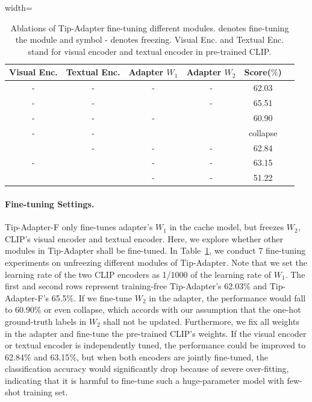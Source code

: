 \documentclass[10pt,twocolumn,letterpaper]{article}
\begin{document}
\begin{table}[t!]
\centering
\vspace*{13pt}
\begin{adjustbox}{width=\linewidth}
	\begin{tabular}{cccccc}
	\toprule
		 Visual Enc. & Textual Enc. 
		 & Adapter $W_1$ & Adapter $W_2$ & Score($\%$)\\ \midrule
		- &- &- &- &62.03\\
		- &- &\Checkmark &- &65.51\\
		- & - & - & \Checkmark &60.90\\
		- & - & \Checkmark & \Checkmark &collapse\\
		\Checkmark & - & - & - &62.84\\
		- & \Checkmark & - & - & 63.15\\
	    \Checkmark & \Checkmark & - & - & 51.22\\
	\bottomrule
	\end{tabular}
\end{adjustbox}
\caption{Ablations of Tip-Adapter fine-tuning different modules. \Checkmark denotes fine-tuning the module and symbol - denotes freezing. Visual Enc. and Textual Enc. stand for visual encoder and textual encoder in pre-trained CLIP.}
\vspace*{-12pt}
\label{fine-tune}
\end{table}


\paragraph{Fine-tuning Settings.}
Tip-Adapter-F only fine-tunes adapter's $W_1$ in the cache model, but freezes $W_2$, CLIP's visual encoder and textual encoder. Here, we explore whether other modules in Tip-Adapter shall be fine-tuned. In Table~\ref{fine-tune}, we conduct 7 fine-tuning experiments on unfreezing different modules of Tip-Adapter. Note that we set the learning rate of the two CLIP encoders as 1/1000 of the learning rate of $W_1$. The first and second rows represent training-free Tip-Adapter's 62.03$\%$ and Tip-Adapter-F's 65.5$\%$. If we fine-tune $W_2$ in the adapter, the performance would fall to 60.90$\%$ or even collapse, which accords with our assumption that the one-hot ground-truth labels in $W_2$ shall not be updated. Furthermore, we fix all weights in the adapter and fine-tune the pre-trained CLIP's weights. If the visual encoder or textual encoder is independently tuned, the performance could be improved to 62.84$\%$ and 63.15$\%$, but when both encoders are jointly fine-tuned, the classification accuracy would significantly drop because of severe over-fitting, indicating that it is harmful to  fine-tune such a huge-parameter model with few-shot training set.
\end{document}
